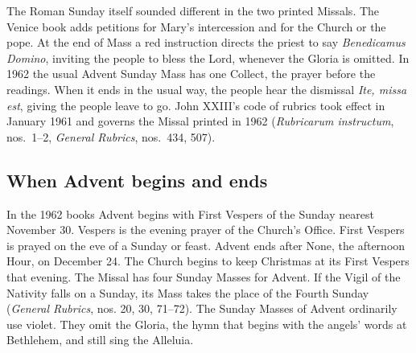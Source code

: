 The Roman Sunday itself sounded different in the two printed Missals.
The Venice book adds
petitions for Mary's intercession and for the Church or the pope. At the
end of Mass a red instruction directs the priest to say \emph{Benedicamus Domino},
inviting the people to bless the Lord, whenever the Gloria is omitted. In
1962 the usual Advent Sunday Mass has one Collect, the prayer before the readings. When it ends in the
usual way, the people hear the dismissal \emph{Ite, missa est},
giving the people leave to go. John XXIII's code of rubrics took
effect in January 1961 and governs the Missal printed in 1962
(\emph{Rubricarum instructum}, nos.~1--2, \emph{General Rubrics},
nos.~434, 507).

\subsection{When Advent begins and ends}

In the 1962 books Advent begins with First Vespers of the Sunday nearest
November 30. Vespers is the evening prayer of the Church's Office. First
Vespers is prayed on the eve of a Sunday or feast. Advent ends after None, the
afternoon Hour, on December 24. The Church begins to keep Christmas at its
First Vespers that evening. The Missal has four Sunday Masses for Advent. If
the Vigil of the Nativity falls on a Sunday, its Mass takes the place of the
Fourth Sunday (\emph{General Rubrics}, nos. 20, 30, 71--72). The Sunday Masses
of Advent ordinarily use violet. They omit the Gloria, the hymn that begins
with the angels' words at Bethlehem, and still sing the Alleluia.

